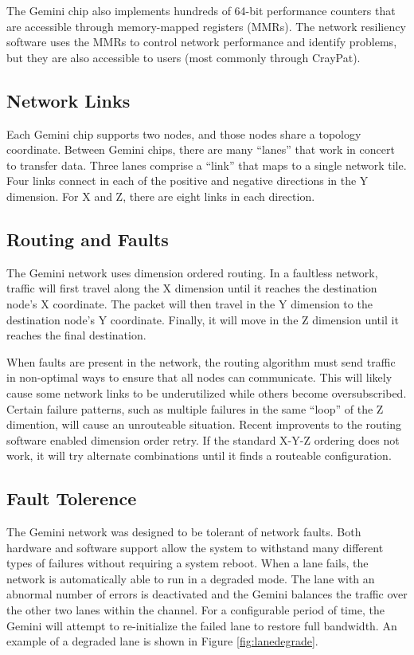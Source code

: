 \documentclass[10pt, conference, compsocconf]{IEEEtran}
\begin{document}
The Gemini chip also implements hundreds of 64-bit performance counters that
are accessible through memory-mapped registers (MMRs).  The network resiliency
software uses the MMRs to control network performance and identify problems,
but they are also accessible to users (most commonly through CrayPat).

\subsection{Network Links}

Each Gemini chip supports two nodes, and those nodes share a topology
coordinate.  Between Gemini chips, there are many ``lanes'' that work in
concert to transfer data.  Three lanes comprise a ``link'' that maps to a
single network tile.  Four links connect in each of the positive and negative
directions in the Y dimension.  For X and Z, there are eight links in each
direction.

\subsection{Routing and Faults}

The Gemini network uses dimension ordered routing.  In a faultless network,
traffic will first travel along the X dimension until it reaches the
destination node's X coordinate.  The packet will then travel in the Y
dimension to the destination node's Y coordinate.  Finally, it will move in the
Z dimension until it reaches the final destination. 

When faults are present in the network, the routing algorithm must send traffic
in non-optimal ways to ensure that all nodes can communicate.  This will likely
cause some network links to be underutilized while others become
oversubscribed.  Certain failure patterns, such as multiple failures in the
same ``loop'' of the Z dimention, will cause an unrouteable situation.  Recent
improvents to the routing software enabled dimension order retry.  If the
standard X-Y-Z ordering does not work, it will try alternate combinations until
it finds a routeable configuration.

\subsection{Fault Tolerence}

The Gemini network was designed to be tolerant of network faults.  Both
hardware and software support allow the system to withstand many different
types of failures without requiring a system reboot.  When a lane fails, the
network is automatically able to run in a degraded mode.  The lane with an
abnormal number of errors is deactivated and the Gemini balances the traffic
over the other two lanes within the channel.  For a configurable period of
time, the Gemini will attempt to re-initialize the failed lane to restore full
bandwidth.  An example of a degraded lane is shown in Figure
\ref{fig:lanedegrade}. 
\end{document}
